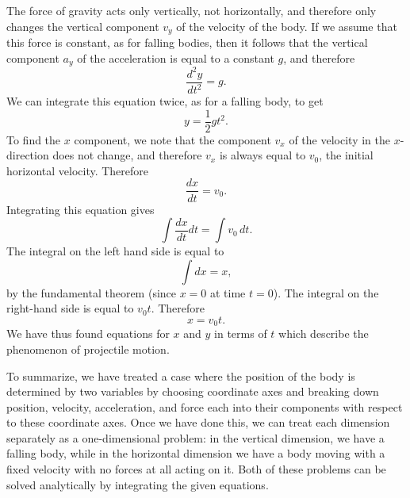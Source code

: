 \documentclass[polutonikogreek,english,twoside,openright]{article}
\begin{document}
The force of gravity acts only vertically, not horizontally, and
therefore only changes the vertical component $v_y$ of the velocity of
the body.  If we assume that this force is constant, as for falling
bodies, then it follows that the vertical component $a_y$ of the
acceleration is equal to a constant $g$, and therefore
$$\frac{d^2y}{dt^2} = g.$$
We can integrate this equation twice, as for a falling body, to get
$$y = \frac{1}{2}gt^2.$$
To find the $x$ component, we note that the component $v_x$ of the
velocity in the $x$-direction does not change, and therefore $v_x$ is
always equal to $v_0$, the initial horizontal velocity.  Therefore
$$\frac{dx}{dt} = v_0.$$
Integrating this equation gives
$$\int\!\frac{dx}{dt}dt = \int\!v_0\,dt.$$
The integral on the left hand side is equal to
$$\int\!dx = x,$$
by the fundamental theorem (since $x=0$ at time $t=0$).  The integral
on the right-hand side is equal to $v_0t.$ Therefore
$$x = v_0t.$$ 
We have thus found equations for $x$ and $y$ in terms of $t$ which
describe the phenomenon of projectile motion.

To summarize, we have treated a case where the position of the body is
determined by two variables by choosing coordinate axes and breaking
down position, velocity, acceleration, and force each into their
components with respect to these coordinate axes.  Once we have done
this, we can treat each dimension separately as a one-dimensional
problem: in the vertical dimension, we have a falling body, while in
the horizontal dimension we have a body moving with a fixed velocity
with no forces at all acting on it.  Both of these problems can be
solved analytically by integrating the given equations. \vspace{2ex}
\end{document}
